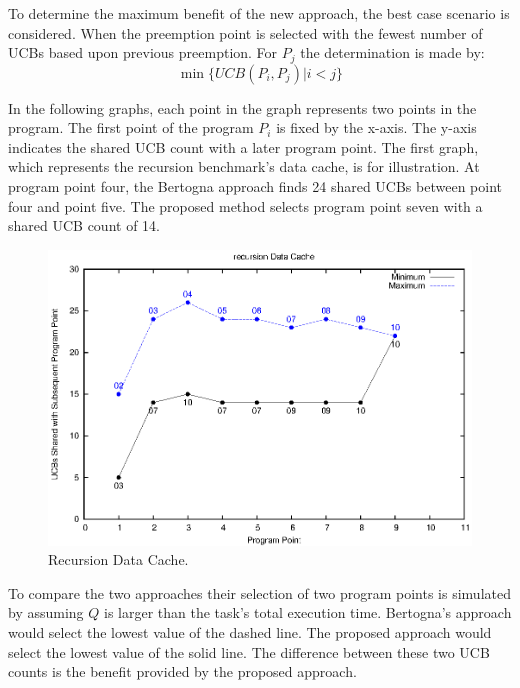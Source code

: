 To determine the maximum benefit of the new approach, the best case
scenario is considered. When the preemption point is selected with the
fewest number of UCBs based upon previous preemption.  For ${P_j}$ the
determination is made by:
\begin{equation*}
  \min\{ UCB(P_i, P_j) \vert i < j \}
\end{equation*}

In the following graphs, each point in the graph represents two points
in the program. The first point of the program ${P_i}$ is fixed by the
x-axis. The y-axis indicates the shared UCB count with a later program
point. The first graph, which represents the recursion benchmark's
data cache, is for illustration. At program point four, the Bertogna
approach finds 24 shared UCBs between point four and point five. The
proposed method selects program point seven with a shared UCB count of
14.
%
\begin{figure}[h!]
\vspace{-10pt}
\begin{center}
\includegraphics[width=\linewidth]{eps/recursion-dcache.eps}
\caption{Recursion Data Cache.}
\label{fig:recusion_data_cache}
\end{center}
\vspace{-20pt}
\end{figure}
To compare the two approaches their selection of two program points is
simulated by assuming ${Q}$ is larger than the task's total execution
time. Bertogna's approach would select the lowest value of the
dashed line. The proposed approach would select the lowest value of
the solid line. The difference between these two UCB counts is the
benefit provided by the proposed approach.
